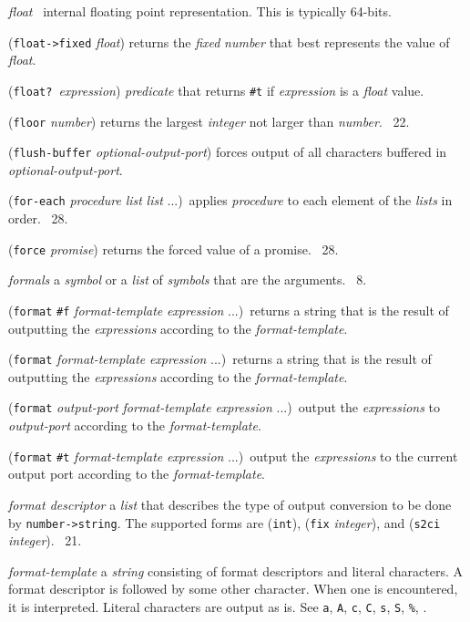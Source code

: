 \documentclass[10pt,twocolumn]{article}
\begin{document}
\emph{float} \StoC\ internal floating point representation.  This is
typically 64-bits.

(\texttt{float->fixed} \emph{float}) returns the \emph{fixed}
\emph{number} that best represents the value of \emph{float}.

(\texttt{float?}\ \emph{expression}) \emph{predicate} that returns
\texttt{\#t} if \emph{expression} is a \emph{float} value.

(\texttt{floor} \emph{number}) returns the largest \emph{integer} not
larger than \emph{number}.  \RRRRRS~22.

(\texttt{flush-buffer} \emph{optional-output-port}) forces output of
all characters buffered in \emph{optional-output-port}.

(\texttt{for-each} \emph{procedure} \emph{list} \emph{list}
...)\ applies \emph{procedure} to each element of the \emph{lists} in
order.  \RRRRRS~28.

(\texttt{force} \emph{promise}) returns the forced value of a promise.
\RRRRRS~28.

\emph{formals} a \emph{symbol} or a \emph{list} of \emph{symbols} that
are the arguments.  \RRRRRS~8.

(\texttt{format} \texttt{\#f} \emph{format-template} \emph{expression}
...)\ returns a string that is the result of outputting the
\emph{expressions} according to the \emph{format-template}.

(\texttt{format} \emph{format-template} \emph{expression}
...)\ returns a string that is the result of outputting the
\emph{expressions} according to the \emph{format-template}.

(\texttt{format} \emph{output-port} \emph{format-template}
\emph{expression} ...)\ output the \emph{expressions} to
\emph{output-port} according to the \emph{format-template}.

(\texttt{format} \texttt{\#t} \emph{format-template} \emph{expression}
...)\ output the \emph{expressions} to the current output port
according to the \emph{format-template}.

\emph{format descriptor} a \emph{list} that describes the type of
output conversion to be done by \texttt{number->string}.  The
supported forms are (\texttt{int}), (\texttt{fix} \emph{integer}), and
(\texttt{s2ci} \emph{integer}).  \RRRRRS~21.

\emph{format-template} a \emph{string} consisting of format
descriptors and literal characters.  A format descriptor is
\texttt{\texttildelow} followed by some other character.  When one is
encountered, it is interpreted.  Literal characters are output as is.
See \texttt{\texttildelow{}a}, \texttt{\texttildelow{}A},
\texttt{\texttildelow{}c}, \texttt{\texttildelow{}C},
\texttt{\texttildelow{}s}, \texttt{\texttildelow{}S},
\texttt{\texttildelow\%}, \texttt{\texttildelow\texttildelow}.
\end{document}
